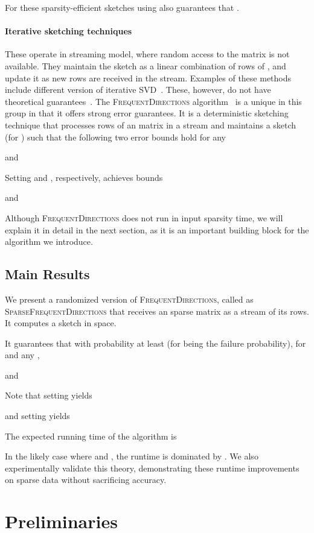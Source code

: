 \documentclass[11pt]{article}
\newcommand{\fd}{\textsc{FrequentDirections}\xspace}
\newcommand{\sfd}{\textsc{SparseFrequentDirections}\xspace}
\newcommand{\Paragraph}[1]{\paragraph*{\sffamily \textbf{#1}}}
\begin{document}
For these sparsity-efficient sketches using  also guarantees that 
.    


\Paragraph{Iterative sketching techniques} 
These operate in streaming model, where random access to the matrix is not available. 
They maintain the sketch  as a linear combination of rows of , and update it as new rows are received in the stream.  
Examples of these methods include different version of iterative SVD~\cite{golub2012matrix, hall1998incremental, levey2000sequential, brand2002incremental,ross2008incremental}. These, however, do not have theoretical guarantees~\cite{desai2015improved}.   
The \fd algorithm~\cite{liberty2013simple} is a unique in this group in that it offers strong error guarantees. 
It is a deterministic sketching technique that processes rows of an  matrix  in a stream and maintains a  sketch  (for ) such that the following two error bounds hold for any 

and

Setting  and , respectively, achieves bounds 

and

Although \fd does not run in input sparsity time, we will explain it in detail in the next section, as it is an important building block for the algorithm we introduce.  

\subsection{Main Results} 
We present a randomized version of \fd, called as \sfd that receives an  sparse matrix  as a stream of its rows. 
It computes a  sketch  in  space. 

It guarantees that with probability at least  (for  being the failure probability), for  and any ,

and
 
Note that setting  yields 

and setting  yields 


The expected running time of the algorithm is
 
In the likely case where  and , the runtime is dominated by .  
We also experimentally validate this theory, demonstrating these runtime improvements on sparse data without sacrificing accuracy.  





\section{Preliminaries}
\end{document}
